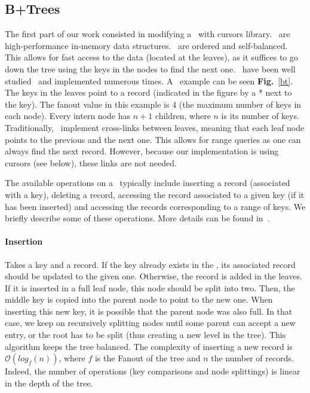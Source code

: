 %
\subsection{B+Trees}
The first part of our work consisted in modifying a \btrees\ with cursors library.
\btrees\ are high-performance in-memory data structures. \btrees\ are ordered and self-balanced.
This allows for fast access to the data (located at the leaves), as it suffices to go down the tree using the keys in the nodes to find the next one.
\btrees\ have been well studied~\cite{dbms} and implemented numerous times. %
A \btree\ example can be seen \textbf{Fig.}~\ref{bt}.
The keys in the leaves point to a record (indicated in the figure by a * next to the key).
The fanout value in this example is 4 (the maximum number of keys in each node).
Every intern node has $n+1$ children, where $n$ is its number of keys.
Traditionally, \btrees\ implement cross-links between leaves, meaning that each leaf node points to the previous and the next one.
This allows for range queries as one can always find the next record.
However, because our implementation is using cursors (see below), these links are not needed.

The available operations on a \btree\ typically include inserting a record (associated with a key), deleting a record, accessing the record associated to a given key (if it has been inserted) and accessing the records corresponding to a range of keys.
We briefly describe some of these operations. More details can be found in~\cite{dbms}.
\paragraph{Insertion} Takes a key and a record.
If the key already exists in the \btree, its associated record should be updated to the given one. Otherwise, the record is added in the leaves.
If it is inserted in a full leaf node, this node should be split into two. Then, the middle key is copied into the parent node to point to the new one.
When inserting this new key, it is possible that the parent node was also full.
In that case, we keep on recursively splitting nodes until some parent can accept a new entry, or the root has to be split (thus creating a new level in the tree).
This algorithm keeps the tree balanced.
The complexity of inserting a new record is $\mathcal{O}(log_{f}(n))$, where $f$ is the Fanout of the tree and $n$ the number of records.
Indeed, the number of operations (key comparisons and node splittings) is linear in the depth of the tree.

